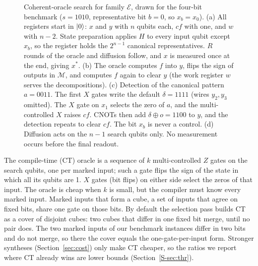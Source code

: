 \documentclass[journal]{IEEEtran}
\newcommand{\famE}{\mathcal{E}}
\begin{document}
\begin{figure}[!t]
{}
\caption{Coherent-oracle search for family $\famE$, drawn for the four-bit
benchmark ($s=1010$, representative bit $b=0$, so $x_b=x_0$). (a) All registers
start in $\ket{0}$: $x$ and $y$ with $n$ qubits each, $\mathit{cf}$ with one, and
$w$ with $n-2$. State preparation applies $H$ to every input qubit except $x_b$,
so the register holds the $2^{n-1}$ canonical representatives. $R$ rounds of the
oracle and diffusion follow, and $x$ is measured once at the end, giving $x^{*}$. (b) The oracle
computes $f$ into $y$, flips the sign of outputs in $\mathcal{M}$, and computes
$f$ again to clear $y$ (the work register $w$ serves the decompositions). (c)
Detection of the canonical pattern $a=0011$. The first $X$ gates write the
default $\delta=1111$ (wires $y_2,y_3$ omitted). The $X$ gate on $x_1$ selects
the zero of $a$, and the multi-controlled $X$ raises $\mathit{cf}$. CNOTs then
add $\delta\oplus o=1100$ to $y$, and the detection repeats to clear
$\mathit{cf}$. The bit $x_b$ is never a control. (d) Diffusion acts on the $n-1$
search qubits only. No measurement occurs before the final readout.}
\label{fig:circuit}
\end{figure}

The compile-time (CT) oracle is a sequence of $k$ multi-controlled $Z$ gates on
the search qubits, one per marked input; such a gate flips the sign of the state
in which all its qubits are 1. $X$ gates (bit flips) on either side select the
zeros of that input. The oracle is cheap when $k$ is small, but the compiler
must know every marked input. Marked inputs that form a cube, a set of inputs
that agree on fixed bits, share one gate on those bits. By default the selection
pass builds CT as a cover of disjoint cubes: two cubes that differ in one fixed
bit merge, until no pair does. The two marked inputs of our benchmark instances
differ in two bits and do not merge, so there the cover equals the
one-gate-per-input form. Stronger syntheses (Section~\ref{sec:cost}) only make CT
cheaper, so the ratios we report where CT already wins are lower bounds
(Section~\ref{S-sec:thr}).
\end{document}
